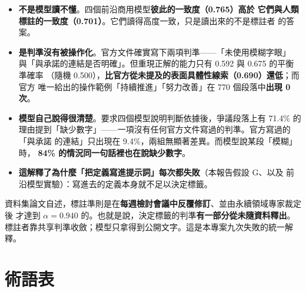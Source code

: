 \documentclass[11pt,a4paper]{ctexart}
\begin{document}
\begin{itemize}[leftmargin=2em, itemsep=3pt]
  \item \textbf{不是模型讀不懂}。四個前沿商用模型\textbf{彼此的一致度（0.765）高於
        它們與人類標註的一致度（0.701）}。它們讀得高度一致，只是讀出來的不是標註者
        的答案。
  \item \textbf{是判準沒有被操作化}。官方文件確實寫下兩項判準——「未使用模糊字眼」
        與「與承諾的連結是否明確」。但重現正解的能力只有 0.592 與 0.675 的平衡準確率
        （隨機 0.500），\textbf{比官方從未提及的表面具體性線索（0.690）還低}；而官方
        唯一給出的操作範例「持續推進」「努力改善」在 770 個段落中\textbf{出現 0 次}。
  \item \textbf{模型自己說得很清楚}。要求四個模型說明判斷依據後，爭議段落上有 71.4\%
        的理由提到「缺少數字」——一項沒有任何官方文件寫過的判準。官方寫過的「與承諾
        的連結」只出現在 9.4\%，兩組無顯著差異。而模型說某段「模糊」時，
        \textbf{84\% 的情況同一句話裡也在說缺少數字}。
  \item \textbf{這解釋了為什麼「把定義寫進提示詞」每次都失敗}（本報告假設 G、以及
        前沿模型實驗）：寫進去的定義本身就不足以決定標籤。
\end{itemize}

\begin{tcolorbox}[colback=gray!8, colframe=gray!55]
資料集論文自述，標註準則是在\textbf{每週檢討會議中反覆修訂}、並由永續領域專家裁定後
才達到 $\alpha=0.940$ 的。也就是說，決定標籤的判準\textbf{有一部分從未隨資料釋出}。
標註者靠共享判準收斂；模型只拿得到公開文字。這是本專案九次失敗的統一解釋。
\end{tcolorbox}

\section{術語表}
\label{sec:glossary}
\end{document}
